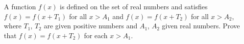 \problem
A function $f(x)$ is defined on the set of real numbers and satisfies
$f(x) = f(x + T_1)$ for all $x > A_1$ and
$f(x) = f(x + T_2)$ for all $x > A_2$,
where $T_1$, $T_2$ are given positive numbers and $A_1$, $A_2$ given real
numbers.
Prove that $f(x) = f(x + T_2)$ for each $x > A_1$.
\solution
\endproblem
